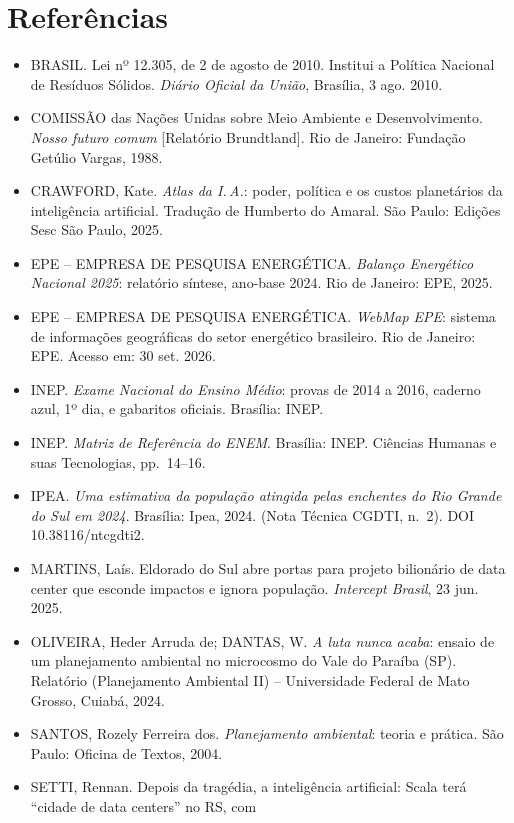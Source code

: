 \documentclass[11pt]{article}
\begin{document}
\section*{Referências}
\begin{itemize}
  \item BRASIL. Lei nº 12.305, de 2 de agosto de 2010. Institui a Política Nacional de Resíduos Sólidos.
        \emph{Diário Oficial da União}, Brasília, 3 ago. 2010.
  \item COMISSÃO das Nações Unidas sobre Meio Ambiente e Desenvolvimento. \emph{Nosso futuro comum} [Relatório
        Brundtland]. Rio de Janeiro: Fundação Getúlio Vargas, 1988.
  \item CRAWFORD, Kate. \emph{Atlas da I.\,A.}: poder, política e os custos planetários da inteligência artificial. Tradução de
        Humberto do Amaral. São Paulo: Edições Sesc São Paulo, 2025.
  \item EPE -- EMPRESA DE PESQUISA ENERGÉTICA. \emph{Balanço Energético Nacional 2025}: relatório síntese, ano-base 2024.
        Rio de Janeiro: EPE, 2025.
  \item EPE -- EMPRESA DE PESQUISA ENERGÉTICA. \emph{WebMap EPE}: sistema de informações geográficas do setor energético
        brasileiro. Rio de Janeiro: EPE. Acesso em: 30 set. 2026.
  \item INEP. \emph{Exame Nacional do Ensino Médio}: provas de 2014 a 2016, caderno azul, 1º dia, e gabaritos oficiais. Brasília: INEP.
  \item INEP. \emph{Matriz de Referência do ENEM}. Brasília: INEP. Ciências Humanas e suas Tecnologias, pp.~14--16.
  \item IPEA. \emph{Uma estimativa da população atingida pelas enchentes do Rio Grande do Sul em 2024}. Brasília: Ipea, 2024.
        (Nota Técnica CGDTI, n.~2). DOI 10.38116/ntcgdti2.
  \item MARTINS, Laís. Eldorado do Sul abre portas para projeto bilionário de data center que esconde impactos e ignora
        população. \emph{Intercept Brasil}, 23 jun. 2025.
  \item OLIVEIRA, Heder Arruda de; DANTAS, W. \emph{A luta nunca acaba}: ensaio de um planejamento ambiental no
        microcosmo do Vale do Paraíba (SP). Relatório (Planejamento Ambiental II) -- Universidade Federal de Mato
        Grosso, Cuiabá, 2024.
  \item SANTOS, Rozely Ferreira dos. \emph{Planejamento ambiental}: teoria e prática. São Paulo: Oficina de Textos, 2004.
  \item SETTI, Rennan. Depois da tragédia, a inteligência artificial: Scala terá \enquote{cidade de data centers} no RS, com

\end{itemize}
\end{document}
